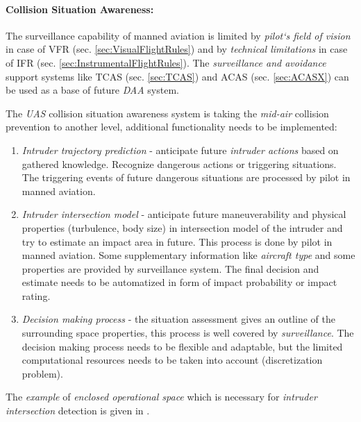\paragraph{Collision Situation Awareness:} The surveillance capability of manned aviation is limited by \emph{pilot`s field of vision} in case of VFR (sec. \ref{sec:VisualFlightRules}) and by \emph{technical limitations} in case of IFR (sec. \ref{sec:InstrumentalFlightRules}). The \emph{surveillance and avoidance} support systems like TCAS (sec. \ref{sec:TCAS}) and ACAS (sec. \ref{sec:ACASX}) can be used as a base of future \emph{DAA} system.

The \emph{UAS} collision situation awareness system is taking the \emph{mid-air} collision prevention to another level, additional functionality needs to be implemented:

\begin{enumerate}
    \item \emph{Intruder trajectory prediction} - anticipate future \emph{intruder actions} based on gathered knowledge. Recognize dangerous actions or triggering situations. The triggering events of future dangerous situations are processed by pilot in manned aviation.
    
    \item \emph{Intruder intersection model} - anticipate future maneuverability and physical properties (turbulence, body size) in intersection model of the intruder and try to estimate an impact area in future. This process is done by pilot in manned aviation. Some supplementary information like \emph{aircraft type} and some properties are provided by surveillance system. The final decision and estimate needs to be automatized in form of impact probability or impact rating. 
    
    \item \emph{Decision making process} - the situation assessment gives an outline of the surrounding space properties, this process is well covered by \emph{surveillance}. The decision making process needs to be flexible and adaptable, but the limited computational resources needs to be taken into account (discretization problem).
\end{enumerate}

\begin{note}
    The \emph{example} of \emph{enclosed operational space} which is necessary for \emph{intruder intersection} detection is given in \cite{welzl1991smallest}.
\end{note}
